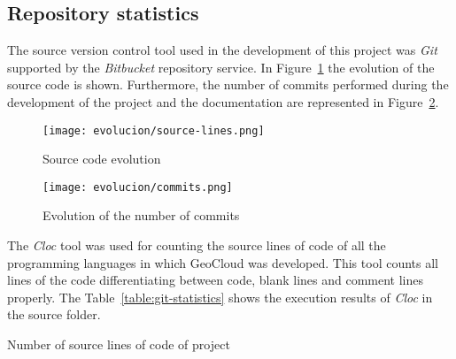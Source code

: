 \subsection{Repository statistics}

The source version control tool used in the development of this project was \emph{Git}
supported by the \emph{Bitbucket} repository service. In Figure~\ref{fig:source-lines} the
evolution of the source code is shown. Furthermore, the number of commits
performed during the development of the project and the documentation are
represented in Figure~\ref{fig:commits}.

\begin{figure}[!h]
\begin{center}
\texttt{[image: evolucion/source-lines.png]}
\caption{Source code evolution}
\label{fig:source-lines}
\end{center}
\end{figure}

\begin{figure}[!h]
\begin{center}
\texttt{[image: evolucion/commits.png]}
\caption{Evolution of the number of commits}
\label{fig:commits}
\end{center}
\end{figure}

The \emph{Cloc} tool was used for counting the source lines of code of all the
programming languages in which
GeoCloud was developed. This tool counts all lines of the code differentiating
between code, blank lines and comment lines properly. The Table~\ref{table:git-statistics} shows the
execution results of \emph{Cloc} in the source folder.

\begin{table}[!h]
  \centering
  {\small
  
  }
  \caption{Number of source lines of code of project}
  \label{table:git-statistics}
\end{table}

